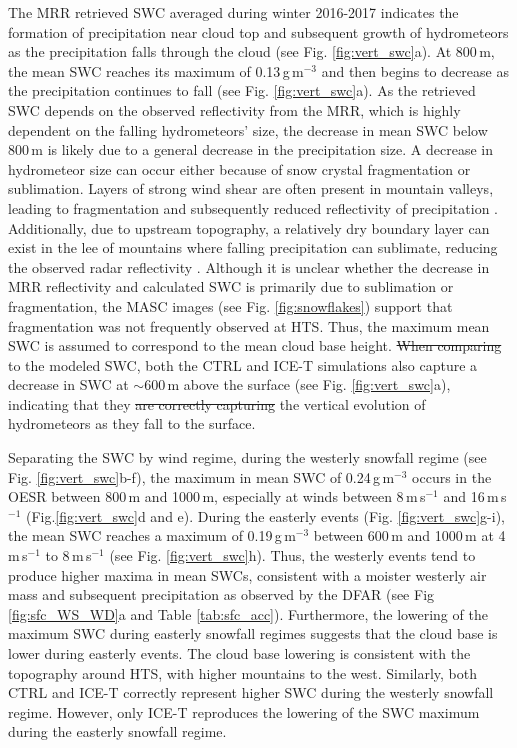\documentclass{ametsocV5}
\providecommand{\DIFadd}[1]{{\protect\color{blue}\uwave{#1}}} %
\providecommand{\DIFdel}[1]{{\protect\color{red}\sout{#1}}}                      %
\providecommand{\DIFaddbegin}{} %
\providecommand{\DIFaddend}{} %
\providecommand{\DIFdelbegin}{} %
\providecommand{\DIFdelend}{} %
\newcommand{\DIFscaledelfig}{0.5}
\newlength{\DIFdelgraphicswidth} %
\newlength{\DIFdelgraphicsheight} %
\newcommand{\DIFaddincludegraphics}[2][]{{\color{blue}\fbox{\DIFOincludegraphics[#1]{#2}}}} %
\newcommand{\DIFdelincludegraphics}[2][]{%
\sbox{\DIFdelgraphicsbox}{\DIFOincludegraphics[#1]{#2}}%
\settoboxwidth{\DIFdelgraphicswidth}{\DIFdelgraphicsbox} %
\settoboxtotalheight{\DIFdelgraphicsheight}{\DIFdelgraphicsbox} %
\scalebox{\DIFscaledelfig}{%
\parbox[b]{\DIFdelgraphicswidth}{\usebox{\DIFdelgraphicsbox}\\[-\baselineskip] \rule{\DIFdelgraphicswidth}{0em}}\llap{\resizebox{\DIFdelgraphicswidth}{\DIFdelgraphicsheight}{%
\setlength{\unitlength}{\DIFdelgraphicswidth}%
\begin{picture}(1,1)%
\thicklines\linethickness{2pt} %
{\color[rgb]{1,0,0}\put(0,0){\framebox(1,1){}}}%
{\color[rgb]{1,0,0}\put(0,0){\line( 1,1){1}}}%
{\color[rgb]{1,0,0}\put(0,1){\line(1,-1){1}}}%
\end{picture}%
}\hspace*{3pt}}} %
} %
\DeclareRobustCommand{\DIFaddbegin}{\DIFOaddbegin \let\includegraphics\DIFaddincludegraphics} %
\DeclareRobustCommand{\DIFaddend}{\DIFOaddend \let\includegraphics\DIFOincludegraphics} %
\DeclareRobustCommand{\DIFdelbegin}{\DIFOdelbegin \let\includegraphics\DIFdelincludegraphics} %
\DeclareRobustCommand{\DIFdelend}{\DIFOaddend \let\includegraphics\DIFOincludegraphics} %
\begin{document}
		The MRR retrieved SWC averaged during winter 2016-2017 indicates the formation of precipitation near cloud top and subsequent growth of hydrometeors as the precipitation falls through the cloud (see Fig. \ref{fig:vert_swc}a). At 800\,m, the mean SWC reaches its maximum of 0.13\,g\,m$^{-3}$ and then begins to decrease as the precipitation continues to fall (see Fig. \ref{fig:vert_swc}a). 
		As the retrieved SWC depends on the observed reflectivity from the MRR, which is highly dependent on the falling hydrometeors' size, the decrease in mean SWC below 800\,m is likely due to a general decrease in the precipitation size. A decrease in hydrometeor size can occur either because of snow crystal fragmentation or sublimation. 
		Layers of strong wind shear are often present in mountain valleys, leading to fragmentation and subsequently reduced reflectivity of precipitation \citep{ramelli_influence_2020}. Additionally, due to upstream topography, a relatively dry boundary layer can exist in the lee of mountains where falling precipitation can sublimate, reducing the observed radar reflectivity \citep[e.g.,][]{ramelli_microphysical_2020}. Although it is unclear whether the decrease in MRR reflectivity and calculated SWC is primarily due to sublimation or fragmentation, the MASC images (see Fig. \ref{fig:snowflakes}) support that fragmentation was not frequently observed at HTS. 
		Thus, the maximum mean SWC is assumed to correspond to the mean cloud base height. \DIFdelbegin \DIFdel{When comparing }\DIFdelend \DIFaddbegin \DIFadd{Compared }\DIFaddend to the modeled SWC, both the CTRL and ICE-T simulations also capture a decrease in SWC at $\sim$600\,m above the surface (see Fig. \ref{fig:vert_swc}a), indicating that they \DIFdelbegin \DIFdel{are correctly capturing }\DIFdelend \DIFaddbegin \DIFadd{correctly account for }\DIFaddend the vertical evolution of hydrometeors as they fall to the surface.

		Separating the SWC by wind regime, during the westerly snowfall regime (see Fig. \ref{fig:vert_swc}b-f), the maximum in mean SWC of 0.24\,g\,m$^{-3}$ occurs in the OESR between 800\,m and 1000\,m, especially at winds between 8\,m\,s$^{-1}$ and 16\,m\,s$^{-1}$ (Fig.\ref{fig:vert_swc}d and e). During the easterly events (Fig. \ref{fig:vert_swc}g-i), the mean SWC reaches a maximum of 0.19\,g\,m$^{-3}$ between 600\,m and 1000\,m at 4\,m\,s$^{-1}$ to 8\,m\,s$^{-1}$ (see Fig. \ref{fig:vert_swc}h). Thus, the westerly events tend to produce higher maxima in mean SWCs, consistent with a moister westerly air mass and subsequent precipitation as observed by the DFAR (see Fig \ref{fig:sfc_WS_WD}a and Table \ref{tab:sfc_acc}). Furthermore, the lowering of the maximum SWC during easterly snowfall regimes suggests that the cloud base is lower during easterly events. The cloud base lowering is consistent with the topography around HTS, with higher mountains to the west. Similarly, both CTRL and ICE-T correctly represent higher SWC during the westerly snowfall regime. However, only ICE-T reproduces the lowering of the SWC maximum during the easterly snowfall regime. 
\end{document}
